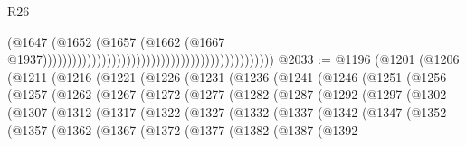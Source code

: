 \begin{lexlean}{R26}
\begin{coremodule}
                                                                                        (@1647
                                                                                          (@1652
                                                                                            (@1657
                                                                                              (@1662
                                                                                                (@1667
                                                                                                  @1937)))))))))))))))))))))))))))))))))))))))))))))))
@2033 := @1196
    (@1201
      (@1206
        (@1211
          (@1216
            (@1221
              (@1226
                (@1231
                  (@1236
                    (@1241
                      (@1246
                        (@1251
                          (@1256
                            (@1257
                              (@1262
                                (@1267
                                  (@1272
                                    (@1277
                                      (@1282
                                        (@1287
                                          (@1292
                                            (@1297
                                              (@1302
                                                (@1307
                                                  (@1312
                                                    (@1317
                                                      (@1322
                                                        (@1327
                                                          (@1332
                                                            (@1337
                                                              (@1342
                                                                (@1347
                                                                  (@1352
                                                                    (@1357
                                                                      (@1362
                                                                        (@1367
                                                                          (@1372
                                                                            (@1377
                                                                              (@1382
                                                                                (@1387
                                                                                  (@1392

\end{coremodule}
\end{lexlean}
